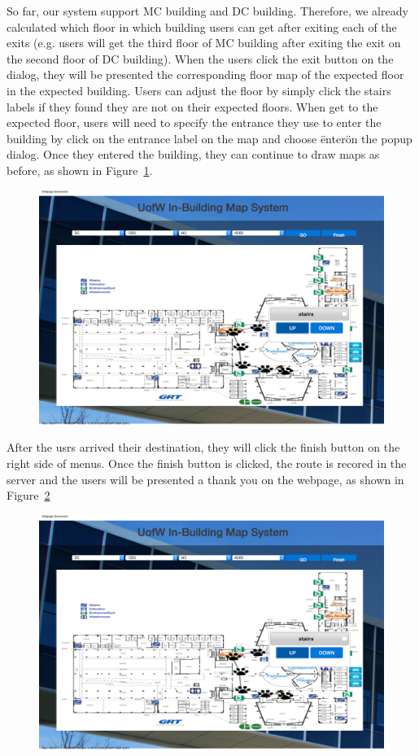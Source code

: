 \documentclass{sigchi}
\begin{document}
So far, our system support MC building and DC building. Therefore, we already calculated which floor in which building users can get after exiting each of the exits (e.g. users will get the third floor of MC building after exiting the exit on the second floor of DC building). When the users click the exit button on the dialog, they will be presented the corresponding floor map of the expected floor in the expected building. Users can adjust the floor by simply click the stairs labels if they found they are not on their expected floors. When get to the expected floor, users will need to specify the entrance they use to enter the building by click on the entrance label on the map and choose \"enter\" on the popup dialog. Once they entered the building, they can continue to draw maps as before, as shown in Figure~\ref{fig:map5}.


\begin{figure}[!h]
\centering
\includegraphics[width=0.6\columnwidth]{pics/map5.png}
\label{fig:map5}
\end{figure}

After the usrs arrived their destination, they will click the finish button on the right side of menus. Once the finish button is clicked, the route is recored in the server and the users will be presented a thank you on the webpage, as shown in Figure~\ref{fig:map6}

\begin{figure}[!h]
\centering
\includegraphics[width=0.6\columnwidth]{pics/map6.png}
\label{fig:map6}
\end{figure}
\end{document}
